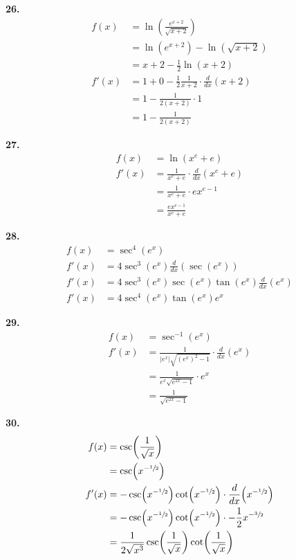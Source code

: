 \documentclass[10pt,oneside,]{book}
\theoremstyle{plain}
\theoremstyle{definition}
\numberwithin{equation}{section}
\newcommand{\fe}[2]{#1\mathopen{}\left(#2\right)\mathclose{}}
\newcommand{\fd}[1]{#1'}
\newcommand{\lzoo}[2]{{\frac{d}{d#1}}{\left(#2\right)}}
\newcommand{\abs}[1]{\left|#1\right|}
\begin{document}
\noindent\textbf{26.}\quad{}\begin{align*}
\fe{f}{x}&=\fe{\ln}{\frac{e^{x+2}}{\sqrt{x+2}}}\\
&=\fe{\ln}{e^{x+2}}-\fe{\ln}{\sqrt{x+2}}\\
&=x+2-\frac{1}{2}\fe{\ln}{x+2}\\
\fe{\fd{f}}{x}&=1+0-\frac{1}{2}\frac{1}{x+2}\cdot\lzoo{x}{x+2}\\
&=1-\frac{1}{2(x+2)}\cdot1\\
&=1-\frac{1}{2(x+2)}
\end{align*}%
\par\smallskip
\noindent\textbf{27.}\quad{}\begin{align*}
\fe{f}{x}&=\fe{\ln}{x^e+e}\\
\fe{\fd{f}}{x}&=\frac{1}{x^e+e}\cdot\lzoo{x}{x^e+e}\\
&=\frac{1}{x^e+e}\cdot ex^{e-1}\\
&=\frac{ex^{e-1}}{x^e+e}
\end{align*}%
\par\smallskip
\noindent\textbf{28.}\quad{}\begin{align*}
\fe{f}{x}&=\fe{\sec^4}{e^x}\\
\fe{\fd{f}}{x}&=4\fe{\sec^3}{e^x}\lzoo{x}{\fe{\sec}{e^x}}\\
\fe{\fd{f}}{x}&=4\fe{\sec^3}{e^x}\fe{\sec}{e^x}\fe{\tan}{e^x}\lzoo{x}{e^x}\\
\fe{\fd{f}}{x}&=4\fe{\sec^4}{e^x}\fe{\tan}{e^x}e^x
\end{align*}%
\par\smallskip
\noindent\textbf{29.}\quad{}\begin{align*}
\fe{f}{x}&=\fe{\sec^{-1}}{e^x}\\
\fe{\fd{f}}{x}&=\frac{1}{\abs{e^x}\sqrt{\left(e^x\right)^2-1}}\cdot\lzoo{x}{e^x}\\
&=\frac{1}{e^x\sqrt{e^{2x}-1}}\cdot e^x\\
&=\frac{1}{\sqrt{e^{2x}-1}}
\end{align*}%
\par\smallskip
\noindent\textbf{30.}\quad{}\begin{align*}
\fe{f}{x}&=\fe{\csc}{\frac{1}{\sqrt{x}}}\\
&=\fe{\csc}{x^{-\sfrac{1}{2}}}\\
\fe{\fd{f}}{x}&=-\fe{\csc}{x^{-\sfrac{1}{2}}}\fe{\cot}{x^{-\sfrac{1}{2}}}\cdot\lzoo{x}{x^{-\sfrac{1}{2}}}\\
&=-\fe{\csc}{x^{-\sfrac{1}{2}}}\fe{\cot}{x^{-\sfrac{1}{2}}}\cdot-\frac{1}{2}x^{-\sfrac{3}{2}}\\
&=\frac{1}{2\sqrt{x^3}}\fe{\csc}{\frac{1}{\sqrt{x}}}\fe{\cot}{\frac{1}{\sqrt{x}}}
\end{align*}%
\end{document}
